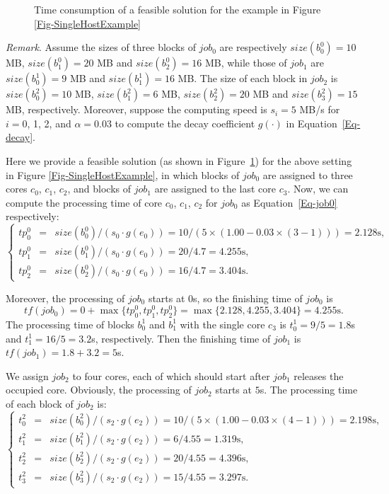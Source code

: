 \documentclass{llncs}
\begin{document}
\begin{figure}[htbp]
\begin{minipage}[t]{0.6\textwidth}
\caption{Time consumption of a feasible solution for the example in Figure \ref{Fig-SingleHostExample}}
\label{Fig-SingleHostResult}
\end{minipage}
\end{figure}


\emph{Remark}. Assume the sizes of three blocks of $job_0$ are respectively $size(b^0_0)=10$ MB, $size(b^0_1)=20$ MB and $size(b^0_2) = 16$ MB, while those of $job_1$ are $size(b^1_0) = 9$ MB and $size(b^1_1) = 16$ MB. The size of each block in $job_2$ is $size(b^2_0) = 10$ MB, $size(b^2_1) = 6$ MB, $size(b^2_2) = 20$ MB and $size(b^2_3) = 15$ MB, respectively. Moreover, suppose the computing speed is $s_i=5$ MB/s for $i = 0$, 1, 2, and $\alpha = 0.03$ to compute the decay coefficient $g(\cdot)$ in Equation~\eqref{Eq-decay}.

Here we provide a feasible solution (as shown in Figure~\ref{Fig-SingleHostResult}) for the above setting in Figure \ref{Fig-SingleHostExample}, in which blocks of $job_0$ are assigned to three cores $c_0$, $c_1$, $c_2$, and blocks of $job_1$ are assigned to the last core $c_3$. Now, we can compute the processing time of core $c_0$, $c_1$, $c_2$ for $job_0$ as Equation~\eqref{Eq-job0} respectively:
\begin{equation} \label{Eq-job0}
\left\{
\begin{array}{ccl}
 tp^0_0  & = &  size(b_0^0)/(s_0\cdot g(e_0))=10 / (5 \times (1.00 - 0.03 \times (3-1))) = 2.128\text{s},\\
 tp^0_1  & = & size(b_1^0)/(s_0\cdot g(e_0)) = 20/4.7 = 4.255\text{s},\\
 tp^0_2 & = & size(b_2^0)/(s_0\cdot g(e_0)) = 16/4.7 = 3.404\text{s}.
\end{array}
\right.
\end{equation}

Moreover, the processing of $job_0$ starts at $0$s, so the finishing time of $job_0$ is $$tf(job_0) =0+ \max \{ tp^0_0, tp^0_1, tp^0_2\} = \max \{2.128, 4.255, 3.404\} = 4.255\text{s}.$$ The processing time of blocks $b^1_0$ and $b^1_1$ with the single core $c_3$ is $t^1_0 = 9/5 = 1.8$s and $t^1_1 = 16/5 = 3.2$s, respectively. Then the finishing time of $job_1$ is $tf(job_1) = 1.8 + 3.2 = 5$s.

We assign $job_2$ to four cores, each of which should start after $job_1$ releases the occupied core. Obviously, the processing of $job_2$ starts at $5$s. The processing time of each block of $job_2$ is:
\begin{equation*}
\left\{
\begin{array}{ccl}
 t^2_0 & = & size(b^2_0)/(s_2\cdot g(e_2))=10 / (5 \times (1.00 - 0.03 \times (4-1))) = 2.198\text{s},  \\
 t^2_1 & = & size(b^2_1)/(s_2\cdot g(e_2)) = 6/4.55 = 1.319\text{s}, \\
 t^2_2 & = & size(b^2_2)/(s_2\cdot g(e_2))= 20/4.55 = 4.396\text{s}, \\
 t^2_3 & = & size(b^2_3)/(s_2\cdot g(e_2))= 15/4.55 = 3.297\text{s}.
\end{array}
\right.
\end{equation*}
\end{document}
